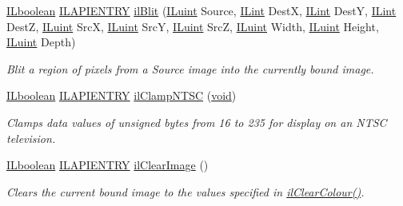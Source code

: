 \begin{DoxyCompactItemize}
\hyperlink{group__il__types_gaa6aa7c95cfdc06b4d8601ef832b7bb0a}{I\+Lboolean} \hyperlink{_i_l_8h_a69c08a8d06df986f7e46f209d131ef2f}{I\+L\+A\+P\+I\+E\+N\+T\+R\+Y} \hyperlink{group__image__manip_ga5733e9e8126ebeea814e1b0f5bb9be44}{il\+Blit} (\hyperlink{group__il__types_gaff8e86a1072c8d7cfe387fb87c6ed8e1}{I\+Luint} Source, \hyperlink{group__il__types_ga8effe51a00daaa0878631e5af75a36cb}{I\+Lint} Dest\+X, \hyperlink{group__il__types_ga8effe51a00daaa0878631e5af75a36cb}{I\+Lint} Dest\+Y, \hyperlink{group__il__types_ga8effe51a00daaa0878631e5af75a36cb}{I\+Lint} Dest\+Z, \hyperlink{group__il__types_gaff8e86a1072c8d7cfe387fb87c6ed8e1}{I\+Luint} Src\+X, \hyperlink{group__il__types_gaff8e86a1072c8d7cfe387fb87c6ed8e1}{I\+Luint} Src\+Y, \hyperlink{group__il__types_gaff8e86a1072c8d7cfe387fb87c6ed8e1}{I\+Luint} Src\+Z, \hyperlink{group__il__types_gaff8e86a1072c8d7cfe387fb87c6ed8e1}{I\+Luint} Width, \hyperlink{group__il__types_gaff8e86a1072c8d7cfe387fb87c6ed8e1}{I\+Luint} Height, \hyperlink{group__il__types_gaff8e86a1072c8d7cfe387fb87c6ed8e1}{I\+Luint} Depth)
\begin{DoxyCompactList}\small\item\em Blit a region of pixels from a {\itshape Source} image into the currently bound image. \end{DoxyCompactList}\item 
\hyperlink{group__il__types_gaa6aa7c95cfdc06b4d8601ef832b7bb0a}{I\+Lboolean} \hyperlink{_i_l_8h_a69c08a8d06df986f7e46f209d131ef2f}{I\+L\+A\+P\+I\+E\+N\+T\+R\+Y} \hyperlink{group__image__manip_gab2c623d693bf0f5c2f046a64af7b22ba}{il\+Clamp\+N\+T\+S\+C} (\hyperlink{_i_l_8h_a5530e04d947bcddd83639ea7940faf10}{void})
\begin{DoxyCompactList}\small\item\em Clamps data values of unsigned bytes from 16 to 235 for display on an N\+T\+S\+C television. \end{DoxyCompactList}\item 
\hyperlink{group__il__types_gaa6aa7c95cfdc06b4d8601ef832b7bb0a}{I\+Lboolean} \hyperlink{_i_l_8h_a69c08a8d06df986f7e46f209d131ef2f}{I\+L\+A\+P\+I\+E\+N\+T\+R\+Y} \hyperlink{group__image__manip_gae48d76d54f6f00fe54b304c29224653f}{il\+Clear\+Image} ()
\begin{DoxyCompactList}\small\item\em Clears the current bound image to the values specified in \hyperlink{group__state_gaca1dc7f7b8e61eb134060c9c8a8b72f2}{il\+Clear\+Colour()}. \end{DoxyCompactList}\item 

\end{DoxyCompactItemize}
